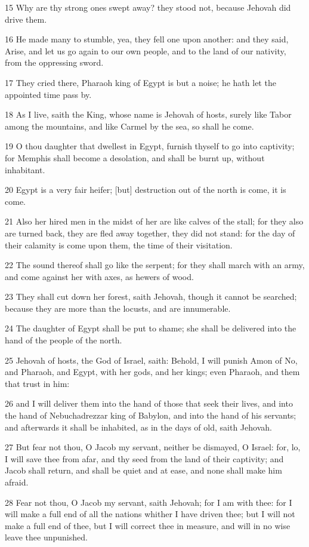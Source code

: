 \par 15 Why are thy strong ones swept away? they stood not, because Jehovah did drive them.
\par 16 He made many to stumble, yea, they fell one upon another: and they said, Arise, and let us go again to our own people, and to the land of our nativity, from the oppressing sword.
\par 17 They cried there, Pharaoh king of Egypt is but a noise; he hath let the appointed time pass by.
\par 18 As I live, saith the King, whose name is Jehovah of hosts, surely like Tabor among the mountains, and like Carmel by the sea, so shall he come.
\par 19 O thou daughter that dwellest in Egypt, furnish thyself to go into captivity; for Memphis shall become a desolation, and shall be burnt up, without inhabitant.
\par 20 Egypt is a very fair heifer; [but] destruction out of the north is come, it is come.
\par 21 Also her hired men in the midst of her are like calves of the stall; for they also are turned back, they are fled away together, they did not stand: for the day of their calamity is come upon them, the time of their visitation.
\par 22 The sound thereof shall go like the serpent; for they shall march with an army, and come against her with axes, as hewers of wood.
\par 23 They shall cut down her forest, saith Jehovah, though it cannot be searched; because they are more than the locusts, and are innumerable.
\par 24 The daughter of Egypt shall be put to shame; she shall be delivered into the hand of the people of the north.
\par 25 Jehovah of hosts, the God of Israel, saith: Behold, I will punish Amon of No, and Pharaoh, and Egypt, with her gods, and her kings; even Pharaoh, and them that trust in him:
\par 26 and I will deliver them into the hand of those that seek their lives, and into the hand of Nebuchadrezzar king of Babylon, and into the hand of his servants; and afterwards it shall be inhabited, as in the days of old, saith Jehovah.
\par 27 But fear not thou, O Jacob my servant, neither be dismayed, O Israel: for, lo, I will save thee from afar, and thy seed from the land of their captivity; and Jacob shall return, and shall be quiet and at ease, and none shall make him afraid.
\par 28 Fear not thou, O Jacob my servant, saith Jehovah; for I am with thee: for I will make a full end of all the nations whither I have driven thee; but I will not make a full end of thee, but I will correct thee in measure, and will in no wise leave thee unpunished.

